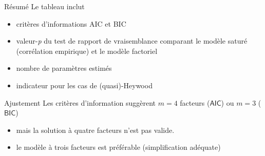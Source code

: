 \documentclass[
  ignorenonframetext,
]{beamer}
\newenvironment{Shaded}{\begin{snugshade}}{\end{snugshade}}
\newcommand{\AttributeTok}[1]{\textcolor[rgb]{0.40,0.45,0.13}{#1}}
\newcommand{\CommentTok}[1]{\textcolor[rgb]{0.37,0.37,0.37}{#1}}
\newcommand{\FloatTok}[1]{\textcolor[rgb]{0.68,0.00,0.00}{#1}}
\newcommand{\FunctionTok}[1]{\textcolor[rgb]{0.28,0.35,0.67}{#1}}
\newcommand{\NormalTok}[1]{\textcolor[rgb]{0.00,0.23,0.31}{#1}}
\newcommand{\OtherTok}[1]{\textcolor[rgb]{0.00,0.23,0.31}{#1}}
\newcommand{\SpecialCharTok}[1]{\textcolor[rgb]{0.37,0.37,0.37}{#1}}
\providecommand{\tightlist}{%
  \setlength{\itemsep}{0pt}\setlength{\parskip}{0pt}}\usepackage{longtable,booktabs,array}
\begin{document}
\begin{frame}{Résumé}
\protect\hypertarget{ruxe9sumuxe9}{}
Le tableau inclut

\begin{itemize}
\item
  critères d'informations AIC et BIC
\item
  valeur-\emph{p} du test de rapport de vraisemblance comparant le
  modèle saturé (corrélation empirique) et le modèle factoriel
\item
  nombre de paramètres estimés
\item
  indicateur pour les cas de (quasi)-Heywood
\end{itemize}
\end{frame}

\begin{frame}[fragile]{Ajustement}
\protect\hypertarget{ajustement}{}
Les critères d'information suggèrent \(m=4\) facteurs (\(\mathsf{AIC}\))
ou \(m=3\) (\(\mathsf{BIC}\))

\begin{itemize}
\tightlist
\item
  mais la solution à quatre facteurs n'est pas valide.
\item
  le modèle à trois facteurs est préférable (simplification adéquate)
\end{itemize}

\begin{Shaded}
\end{Shaded}
\end{frame}
\end{document}
